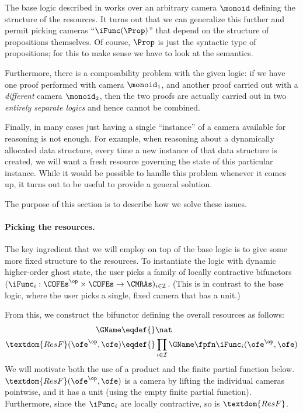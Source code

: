 The base logic described in  works over an arbitrary camera $\monoid$ defining the structure of the resources.
It turns out that we can generalize this further and permit picking cameras ``$\iFunc(\Prop)$'' that depend on the structure of propositions themselves.
Of course, $\Prop$ is just the syntactic type of propositions; for this to make sense we have to look at the semantics.

Furthermore, there is a composability problem with the given logic: if we have one proof performed with camera $\monoid_1$, and another proof carried out with a \emph{different} camera $\monoid_2$, then the two proofs are actually carried out in two \emph{entirely separate logics} and hence cannot be combined.

Finally, in many cases just having a single ``instance'' of a camera available for reasoning is not enough.
For example, when reasoning about a dynamically allocated data structure, every time a new instance of that data structure is created, we will want a fresh resource governing the state of this particular instance.
While it would be possible to handle this problem whenever it comes up, it turns out to be useful to provide a general solution.

The purpose of this section is to describe how we solve these issues.

\paragraph{Picking the resources.}
The key ingredient that we will employ on top of the base logic is to give some more fixed structure to the resources.
To instantiate the logic with dynamic higher-order ghost state, the user picks a family of locally contractive bifunctors $(\iFunc_i : \COFEs^\op \times \COFEs \to \CMRAs)_{i \in \mathcal{I}}$.
(This is in contrast to the base logic, where the user picks a single, fixed camera that has a unit.)

From this, we construct the bifunctor defining the overall resources as follows:
\begin{align*}
  \GName \eqdef{}& \nat \\
  \textdom{ResF}(\ofe^\op, \ofe) \eqdef{}& \prod_{i \in \mathcal I} \GName \fpfn \iFunc_i(\ofe^\op, \ofe)
\end{align*}
We will motivate both the use of a product and the finite partial function below.
$\textdom{ResF}(\ofe^\op, \ofe)$ is a camera by lifting the individual cameras pointwise, and it has a unit (using the empty finite partial function).
Furthermore, since the $\iFunc_i$ are locally contractive, so is $\textdom{ResF}$.

